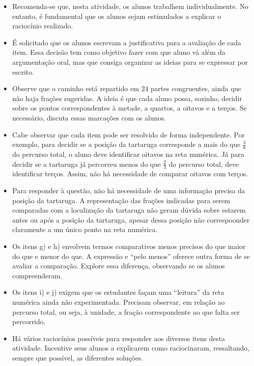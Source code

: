 \documentclass[oneside]{book}
\begin{document}
\begin{multicols}{2}
\begin{itemize} %
    \item       Recomenda-se que, nesta atividade, os alunos trabalhem individualmente. No entanto, é fundamental que os alunos sejam estimulados a explicar o raciocínio realizado.
    \item       É solicitado que os alunos escrevam a justificativa para a avaliação de cada item. Essa decisão tem como objetivo fazer com que aluno vá além da argumentação oral, mas que consiga organizar as ideias para se expressar por escrito. 
    \item       Observe que o caminho está repartido em 24 partes congruentes, ainda que não haja frações sugeridas. A ideia é que cada aluno possa, sozinho, decidir sobre os pontos correspondentes à metade, a quartos, a oitavos e a terços. Se necessário, discuta essas marcações com os alunos. 
    \item       Cabe observar que cada item pode ser resolvido de forma independente. Por exemplo, para decidir se a posição da tartaruga corresponde a mais do que       $\frac{3}{8}$       do percurso total, o aluno deve identificar oitavos na reta numérica. Já para decidir se a tartaruga já percorreu menos do que       $\frac{2}{3}$       do percurso total, deve identificar terços. Assim, não há necessidade de comparar oitavos com terços.
    \item       Para responder à questão, não há necessidade de uma informação precisa da posição da tartaruga. A representação das frações indicadas para serem comparadas com a localização da tartaruga não geram dúvida sobre estarem antes ou após a posição da tartaruga, apesar dessa posição não correspoonder claramente a um único ponto na reta numérica.   
    \item       Os itens g) e h) envolvem termos comparativos menos precisos do que maior do que e menor do que. A expressão e       ``pelo menos''       oferece outra forma de se avaliar a comparação. Explore essa diferença, observando se os alunos compreenderam.
    \item       Os itens i) e j) exigem que os estudantes façam uma       ``leitura''       da reta numérica ainda não experimentada. Precisam observar, em relação ao percurso total, ou seja, à unidade, a fração correspondente ao que falta ser percorrido. 
    \item       Há vários raciocínios possíveis para responder aos diversos itens desta atividade. Incentive seus alunos a explicarem como raciocinaram, ressaltando, sempre que possível, as diferentes soluções. 
\end{itemize} %
  


\end{multicols}
\end{document}
